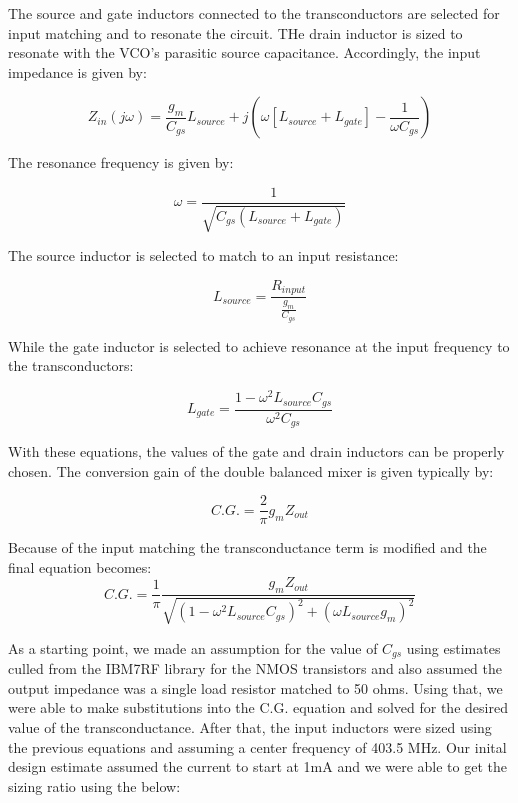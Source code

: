 The source and gate inductors connected to the transconductors are selected for input matching and to resonate the circuit. THe drain inductor is sized to resonate with the VCO's parasitic source capacitance. Accordingly, the input impedance is given by:

\begin{equation} 
  	Z_{in}(j\omega) = \frac{g_{m}}{C_{gs}}L_{source}+j(\omega[L_{source}+L_{gate}]-\frac{1}{\omega C_{gs}})
	\label{eq:mixerZin}
\end{equation}

The resonance frequency is given by:

\begin{equation}
\omega = \frac{1}{\sqrt{C_{gs}(L_{source}+L_{gate})}}
\end{equation}

The source inductor is selected to match to an input resistance:

\begin{equation}
L_{source} = \frac{R_{input}}{\frac{g_{m}}{C_{gs}}}
\end{equation}

While the gate inductor is selected to achieve resonance at the input frequency to the transconductors:

\begin{equation}
L_{gate}=\frac{1-\omega^{2}L_{source}C_{gs}}{\omega^{2}C_{gs}}
\end{equation}

With these equations, the values of the gate and drain inductors can be properly chosen.
The conversion gain of the double balanced mixer is given typically by:

\begin{equation}
C.G. = \frac{2}{\pi}g_{m}Z_{out}
\end{equation}

Because of the input matching the transconductance term is modified and the final equation becomes:
\begin{equation}
C.G. = \frac{1}{\pi}\frac{g_{m}Z_{out}}{\sqrt{(1-\omega^{2}L_{source}C_{gs})^{2}+(\omega L_{source}g_{m})^{2}}}
\end{equation}

As a starting point, we made an assumption for the value of $C_{gs}$ using estimates culled from the IBM7RF library for the NMOS transistors and also assumed the output impedance was a single load resistor matched to 50 ohms. Using that, we were able to make substitutions into the C.G. equation and solved for the desired value of the transconductance. After that, the input inductors were sized using the previous equations and assuming a center frequency of 403.5 MHz. Our inital design estimate assumed the current to start at 1mA and we were able to get the sizing ratio using the below:

